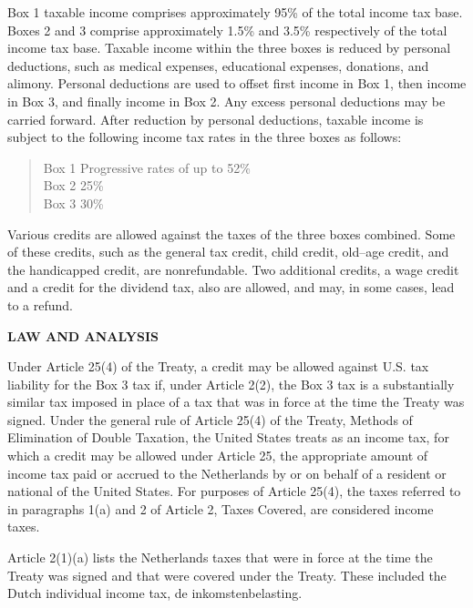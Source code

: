 \begin{select}
Box 1 taxable income comprises approximately 95\% of the total income tax base. Boxes 2 and 3 comprise 
approximately 1.5\% and 3.5\% respectively of the total income tax base. 
Taxable income within the three boxes is reduced by personal deductions, such as medical expenses, educational 
expenses, donations, and alimony. Personal deductions are used to offset first income in Box 1, then income in Box 
3, and finally income in Box 2. Any excess personal deductions may be carried forward. 
After reduction by personal deductions, taxable income is subject to the following income tax rates in the three boxes 
as follows: 
\begin{quote}
Box 1 Progressive rates of up to 52\%\\ 
Box 2 25\% \\
Box 3 30\% \\
\end{quote}
Various credits are allowed against the taxes of the three boxes combined. Some of these credits, such as the general 
tax credit, child credit, old--age credit, and the handicapped credit, are nonrefundable. Two additional credits, a wage 
credit and a credit for the dividend tax, also are allowed, and may, in some cases, lead to a refund. 

\begin{center} \textbf{LAW AND ANALYSIS}
\end{center}

Under Article 25(4) of the Treaty, a credit may be allowed against U.S. tax liability for the Box 3 tax if, under Article 
2(2), the Box 3 tax is a substantially similar tax imposed in place of a tax that was in force at the time the Treaty was 
signed. Under the general rule of Article 25(4) of the Treaty, Methods of Elimination of Double Taxation, the United 
States treats as an income tax, for which a credit may be allowed under Article 25, the appropriate amount of income tax 
paid or accrued to the Netherlands by or on behalf of a resident or national of the United States. For purposes of 
Article 25(4), the taxes referred to in paragraphs 1(a) and 2 of Article 2, Taxes Covered, are considered income taxes. 

Article 2(1)(a) lists the Netherlands taxes that were in force at the time the Treaty was signed and that were covered 
under the Treaty. These included the Dutch individual income tax, de inkomstenbelasting. 


\end{select}
